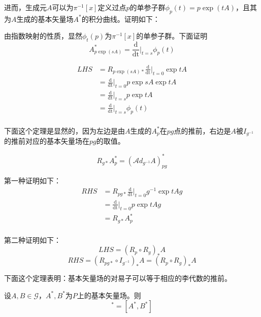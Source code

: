 \documentclass{ctexbook}
\begin{document}
进而，生成元$A$可以为$\pi^{-1}[x]$定义过点$p$的单参子群$\phi_{p}(t)=p\exp{(tA)}$，且其为$A$生成的基本矢量场$A^{*}$的积分曲线。证明如下：

由指数映射的性质，显然$\phi_{t}(p)$为$\pi^{-1}[x]$的单参子群。下面证明 \[A^{*}_{p\exp{(sA)}}=\frac{\mathrm{d}}{\mathrm{dt}}|_{t=s}\phi_{p}(t)\]

\begin{equation}
    \begin{split}
        LHS
        &=R_{p\exp{(sA)}*}\frac{\mathrm{d}}{\mathrm{dt}}|_{t=0}\exp{tA}\\
        &=\frac{\mathrm{d}}{\mathrm{dt}}|_{t=0}p\exp{sA}\exp{tA}\\
        &=\frac{\mathrm{d}}{\mathrm{dt}}|_{t=s}p\exp{tA}\\
        &=\frac{\mathrm{d}}{\mathrm{dt}}|_{t=s}\phi_{p}(t)\\
    \end{split}
\end{equation}

下面这个定理是显然的，因为左边是由$A$生成的$A_p^{*}$在$pg$点的推前，右边是$A$被$I_{g^{-1}}$的推前对应的基本矢量场在$pg$的取值。

\begin{equation}
    R_{g*}A_p^{*}=\left(\mathscr{A}d_{g^{-1}}A\right)^{*}_{pg}
\end{equation}

第一种证明如下：
\begin{equation}
    \begin{split}
        RHS
        &=R_{pg*}\frac{\mathrm{d}}{\mathrm{dt}}|_{t=0}g^{-1}\exp{tA}g\\
        &=\frac{\mathrm{d}}{\mathrm{dt}}|_{t=0}p\exp{tA}g\\
        &=R_{g*}A_{p}^{*}\\
    \end{split}
\end{equation}

第二种证明如下：
\begin{equation}
    LHS=(R_p\circ R_g)_{*}A
\end{equation}
\begin{equation}
    RHS=(R_{pg*}\circ I_{g^{-1}})_{*}A=(R_p\circ R_g)_{*}A
\end{equation}

下面这个定理表明：基本矢量场的对易子可以等于相应的李代数的推前。

设$A,B\in\mathscr{G}$，$A^{*},B^{*}$为$P$上的基本矢量场。则
\begin{equation}
    [A,B]^{*}=[A^{*},B^{*}]
\end{equation}
\end{document}
